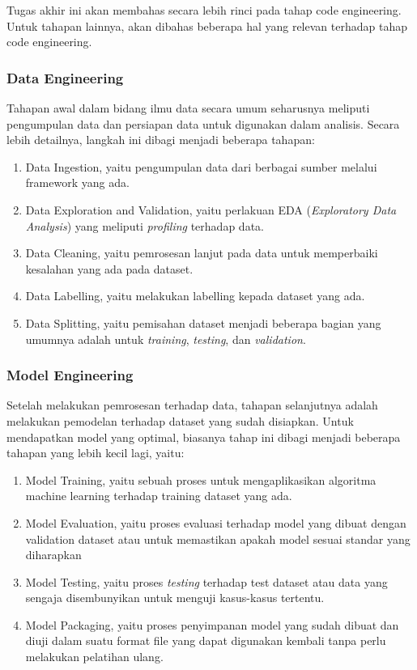 Tugas akhir ini akan membahas secara lebih rinci pada tahap code engineering.
Untuk tahapan lainnya, akan dibahas beberapa hal yang relevan terhadap tahap code engineering.

\subsubsection{Data Engineering}

Tahapan awal dalam bidang ilmu data secara umum seharusnya meliputi pengumpulan data dan persiapan data untuk digunakan dalam analisis.
Secara lebih detailnya, langkah ini dibagi menjadi beberapa tahapan:
\begin{enumerate}
  \item Data Ingestion, yaitu pengumpulan data dari berbagai sumber melalui framework yang ada. 
  \item Data Exploration and Validation, yaitu perlakuan EDA (\textit{Exploratory Data Analysis}) yang meliputi \textit{profiling} terhadap data.
  \item Data Cleaning, yaitu pemrosesan lanjut pada data untuk memperbaiki kesalahan yang ada pada dataset.
  \item Data Labelling, yaitu melakukan labelling kepada dataset yang ada.
  \item Data Splitting, yaitu pemisahan dataset menjadi beberapa bagian yang umumnya adalah untuk \textit{training}, \textit{testing}, dan \textit{validation}.
\end{enumerate}

\subsubsection{Model Engineering}

Setelah melakukan pemrosesan terhadap data, tahapan selanjutnya adalah melakukan pemodelan terhadap dataset yang sudah disiapkan.
Untuk mendapatkan model yang optimal, biasanya tahap ini dibagi menjadi beberapa tahapan yang lebih kecil lagi, yaitu:
\begin{enumerate}
  \item Model Training, yaitu sebuah proses untuk mengaplikasikan algoritma machine learning terhadap training dataset yang ada.
  \item Model Evaluation, yaitu proses evaluasi terhadap model yang dibuat dengan validation dataset atau untuk memastikan apakah model sesuai standar yang diharapkan
  \item Model Testing, yaitu proses \textit{testing} terhadap test dataset atau data yang sengaja disembunyikan untuk menguji kasus-kasus tertentu.
  \item Model Packaging, yaitu proses penyimpanan model yang sudah dibuat dan diuji dalam suatu format file yang dapat digunakan kembali tanpa perlu melakukan pelatihan ulang.
\end{enumerate}

